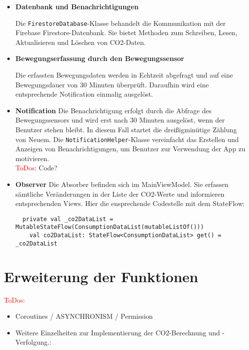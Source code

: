 \documentclass{article}
\begin{document}
\begin{itemize}

\item \textbf{Datenbank und Benachrichtigungen}

Die \texttt{FirestoreDatabase}-Klasse behandelt die Kommunikation mit der Firebase Firestore-Datenbank. Sie bietet Methoden zum Schreiben, Lesen, Aktualisieren und Löschen von CO2-Daten.

\item \textbf{Bewegungserfassung durch den Bewegungssensor}

Die erfassten Bewegungsdaten werden in Echtzeit abgefragt und auf eine Bewegungsdauer von 30 Minuten überprüft. Daraufhin wird eine entsprechende Notification einmalig ausgelöst.

\item \textbf{Notification}
Die Benachrichtigung erfolgt durch die Abfrage des Bewegungssensors und wird erst nach 30 Minuten ausgelöst, wenn der Benutzer stehen bleibt. In diesem Fall startet die dreißigminütige Zählung von Neuem.  Die \texttt{NotificationHelper}-Klasse vereinfacht das Erstellen und Anzeigen von Benachrichtigungen, um Benutzer zur Verwendung der App zu motivieren.\\\textcolor{red}{ToDos}: Code?


\item \textbf{Observer}
Die Absorber befinden sich im MainViewModel. Sie erfassen sämtliche Veränderungen in der Liste der CO2-Werte und informieren entsprechenden Views.
Hier die ensprechende Codestelle mit dem StateFlow:
\begin{lstlisting}
  private val _co2DataList = MutableStateFlow(ConsumptionDataList(mutableListOf()))
    val co2DataList: StateFlow<ConsumptionDataList> get() = _co2DataList
\end{lstlisting}
\end{itemize}
\section{Erweiterung der Funktionen}

\textcolor{red}{ToDos}:

\begin{itemize}
	\item Coroutines / ASYNCHRONISM / Permission
    \item Weitere Einzelheiten zur Implementierung der CO2-Berechnung und -Verfolgung.: 
\end{itemize}
\end{document}
